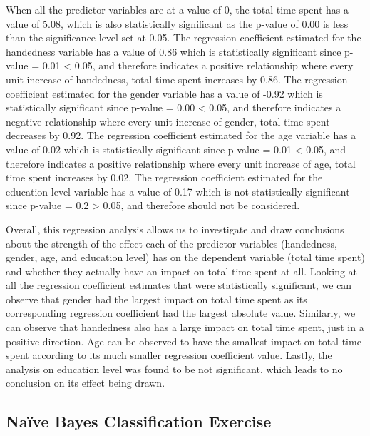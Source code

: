 \documentclass[
]{article}
\begin{document}
When all the predictor variables are at a value of 0, the total time
spent has a value of 5.08, which is also statistically significant as
the p-value of 0.00 is less than the significance level set at 0.05. The
regression coefficient estimated for the handedness variable has a value
of 0.86 which is statistically significant since p-value = 0.01
\textless{} 0.05, and therefore indicates a positive relationship where
every unit increase of handedness, total time spent increases by 0.86.
The regression coefficient estimated for the gender variable has a value
of -0.92 which is statistically significant since p-value = 0.00
\textless{} 0.05, and therefore indicates a negative relationship where
every unit increase of gender, total time spent decreases by 0.92. The
regression coefficient estimated for the age variable has a value of
0.02 which is statistically significant since p-value = 0.01 \textless{}
0.05, and therefore indicates a positive relationship where every unit
increase of age, total time spent increases by 0.02. The regression
coefficient estimated for the education level variable has a value of
0.17 which is not statistically significant since p-value = 0.2
\textgreater{} 0.05, and therefore should not be considered.

Overall, this regression analysis allows us to investigate and draw
conclusions about the strength of the effect each of the predictor
variables (handedness, gender, age, and education level) has on the
dependent variable (total time spent) and whether they actually have an
impact on total time spent at all. Looking at all the regression
coefficient estimates that were statistically significant, we can
observe that gender had the largest impact on total time spent as its
corresponding regression coefficient had the largest absolute value.
Similarly, we can observe that handedness also has a large impact on
total time spent, just in a positive direction. Age can be observed to
have the smallest impact on total time spent according to its much
smaller regression coefficient value. Lastly, the analysis on education
level was found to be not significant, which leads to no conclusion on
its effect being drawn.

\hypertarget{nauxefve-bayes-classification-exercise}{%
\subsection{Naïve Bayes Classification
Exercise}\label{nauxefve-bayes-classification-exercise}}
\end{document}
